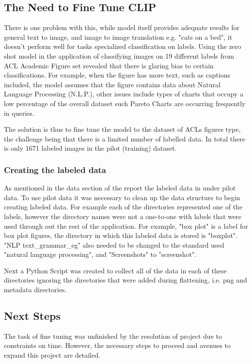 \documentclass[letterpaper, 10 pt, conference]{ieeeconf}  %
\begin{document}
\subsection{The Need to Fine Tune CLIP}
There is one problem with this, while model itself provides adequate results for general text to image, and 
image to image translation e.g. "cats on a bed", it doesn't perform well for tasks specialized classification 
on labels. Using the zero shot model in the application of classifying images on 19 different labels from ACL 
Academic Figure set revealed that there is glaring bias to certain classifications. For example, when the 
figure has more text, such as captions included, the model assumes that the figure contains data about Natural
 Language Processing (N.L.P.), other issues include types of charts that occupy a low percentage of the 
 overall dataset such Pareto Charts are occurring frequently in queries. 

The solution is thus to fine tune the model to the dataset of ACLs figures type, the
challenge being that there is a limited number of labelled data. In total there is only
1671 labeled images in the pilot (training) dataset. 

\subsubsection{Creating the labeled data}
As mentioned in the data section of the report the labeled data in under pilot data. To use pilot data it was 
necessary to clean up the data structure to begin creating labeled data. For example each of the directories 
represented one of the labels, however the directory names were not a one-to-one with labels that were used 
through out the rest of the application. For example, "box plot" is a label for box plot figures, the 
directory in which this labeled data is stored is "boxplot". "NLP text\_grammar\_eg" also needed to be changed
 to the standard used "natural language processing", and "Screenshots" to "screenshot".

Next a Python Script was created to collect all of the data in each of these directories ignoring the
directories that were added during flattening, i.e. png and metadata directories. 

\subsection{Next Steps}
The task of fine tuning was unfinished by the resolution of project due to constraints on time. However, the 
necessary steps to proceed and avenues to expand this project are detailed.
\end{document}
